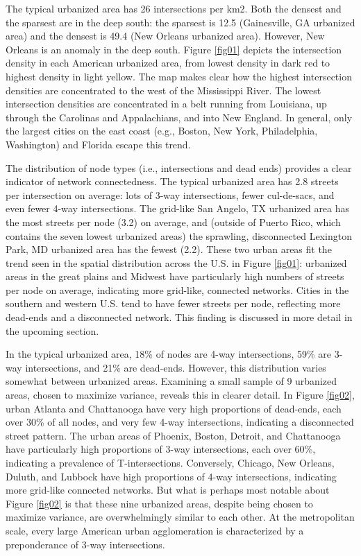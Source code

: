 \documentclass[Afour,sageh,times]{sage/sagej}
\begin{document}
The typical urbanized area has 26 intersections per km2. Both the densest and the sparsest are in the deep south: the sparsest is 12.5 (Gainesville, GA urbanized area) and the densest is 49.4 (New Orleans urbanized area). However, New Orleans is an anomaly in the deep south. Figure \ref{fig01} depicts the intersection density in each American urbanized area, from lowest density in dark red to highest density in light yellow. The map makes clear how the highest intersection densities are concentrated to the west of the Mississippi River. The lowest intersection densities are concentrated in a belt running from Louisiana, up through the Carolinas and Appalachians, and into New England. In general, only the largest cities on the east coast (e.g., Boston, New York, Philadelphia, Washington) and Florida escape this trend.

The distribution of node types (i.e., intersections and dead ends) provides a clear indicator of network connectedness. The typical urbanized area has 2.8 streets per intersection on average: lots of 3-way intersections, fewer cul-de-sacs, and even fewer 4-way intersections. The grid-like San Angelo, TX urbanized area has the most streets per node (3.2) on average, and (outside of Puerto Rico, which contains the seven lowest urbanized areas) the sprawling, disconnected Lexington Park, MD urbanized area has the fewest (2.2). These two urban areas fit the trend seen in the spatial distribution across the U.S. in Figure \ref{fig01}: urbanized areas in the great plains and Midwest have particularly high numbers of streets per node on average, indicating more grid-like, connected networks. Cities in the southern and western U.S. tend to have fewer streets per node, reflecting more dead-ends and a disconnected network. This finding is discussed in more detail in the upcoming section.

In the typical urbanized area, 18\% of nodes are 4-way intersections, 59\% are 3-way intersections, and 21\% are dead-ends. However, this distribution varies somewhat between urbanized areas. Examining a small sample of 9 urbanized areas, chosen to maximize variance, reveals this in clearer detail. In Figure \ref{fig02}, urban Atlanta and Chattanooga have very high proportions of dead-ends, each over 30\% of all nodes, and very few 4-way intersections, indicating a disconnected street pattern. The urban areas of Phoenix, Boston, Detroit, and Chattanooga have particularly high proportions of 3-way intersections, each over 60\%, indicating a prevalence of T-intersections. Conversely, Chicago, New Orleans, Duluth, and Lubbock have high proportions of 4-way intersections, indicating more grid-like connected networks. But what is perhaps most notable about Figure \ref{fig02} is that these nine urbanized areas, despite being chosen to maximize variance, are overwhelmingly similar to each other. At the metropolitan scale, every large American urban agglomeration is characterized by a preponderance of 3-way intersections.
\end{document}
